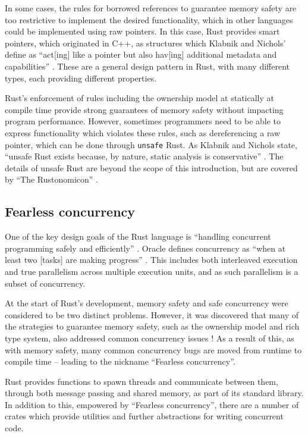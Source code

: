 In some cases, the rules for borrowed references to guarantee memory safety are too restrictive to implement the desired functionality, which in other languages could be implemented using raw pointers. In this case, Rust provides smart pointers, which originated in C++, as structures which Klabnik and Nichols' define as ``act[ing] like a pointer but also hav[ing] additional metadata and capabilities'' \cite{RustProgrammingLanguage}. These are a general design pattern in Rust, with many different types, each providing different properties.

Rust's enforcement of rules including the ownership model at statically at compile time provide strong guarantees of memory safety without impacting program performance. However, sometimes programmers need to be able to express functionality which violates these rules, such as dereferencing a raw pointer, which can be done through \texttt{unsafe} Rust. As Klabnik and Nichols state, ``unsafe Rust exists because, by nature, static analysis is conservative'' \cite{RustProgrammingLanguage}. The details of unsafe Rust are beyond the scope of this introduction, but are covered by ``The Rustonomicon''  \cite{IntroductionRustonomicon}.

\subsection{Fearless concurrency}
\label{ssec:rust-fearless-concurrency}

One of the key design goals of the Rust language is ``handling concurrent programming safely and efficiently'' \cite{RustProgrammingLanguage}. Oracle defines concurrency as ``when at least two [tasks] are making progress'' \cite{DefiningMultithreadingTerms}. This includes both interleaved execution and true parallelism across multiple execution units, and as such parallelism is a subset of concurrency.

At the start of Rust's development, memory safety and safe concurrency were considered to be two distinct problems. However, it was discovered that many of the strategies to guarantee memory safety, such as the ownership model and rich type system, also addressed common concurrency issues \cite{FearlessConcurrencyRust}! As a result of this, as with memory safety, many common concurrency bugs are moved from runtime to compile time -- leading to the nickname ``Fearless concurrency''.

Rust provides functions to spawn threads and communicate between them, through both message passing and shared memory, as part of its standard library. In addition to this, empowered by ``Fearless concurrency'', there are a number of crates which provide utilities and further abstractions for writing concurrent code.

